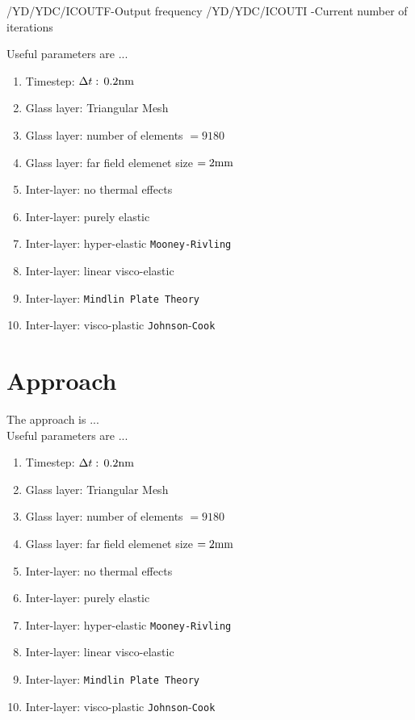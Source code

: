 \documentclass[format=acmtog, 12pt, screen=true, review=false]{acmart}
\begin{document}
/YD/YDC/ICOUTF-Output frequency
/YD/YDC/ICOUTI   -Current number of iterations


Useful parameters are ...
\begin{enumerate}
    \item Timestep: $\Delta t:\,0.2\rm{nm}$ \cite{Che18}
    \item Glass layer: Triangular Mesh \cite{Che18}
    \item Glass layer: number of elements $=9180$ \cite{Che18}
    \item Glass layer: far field elemenet size $=2\rm{mm}$ \cite{Che18}
    \item Inter-layer: no thermal effects \cite{Che18}
    \item Inter-layer: purely elastic \cite{Che18, Ji98}
    \item Inter-layer: hyper-elastic \texttt{Mooney-Rivling} \cite{Che16}
    \item Inter-layer: linear visco-elastic \cite{Flo98}
    \item Inter-layer: \texttt{Mindlin Plate Theory} \cite{Yua17, ElS18}
    \item Inter-layer: visco-plastic \texttt{Johnson}-\texttt{Cook} \cite{Xu11, Gao14}
\end{enumerate}

\section{Approach}

The approach is ... \\

Useful parameters are ...
\begin{enumerate}
    \item Timestep: $\Delta t:\,0.2\rm{nm}$ \cite{Che18}
    \item Glass layer: Triangular Mesh \cite{Che18}
    \item Glass layer: number of elements $=9180$ \cite{Che18}
    \item Glass layer: far field elemenet size $=2\rm{mm}$ \cite{Che18}
    \item Inter-layer: no thermal effects \cite{Che18}
    \item Inter-layer: purely elastic \cite{Che18, Ji98}
    \item Inter-layer: hyper-elastic \texttt{Mooney-Rivling} \cite{Che16}
    \item Inter-layer: linear visco-elastic \cite{Flo98}
    \item Inter-layer: \texttt{Mindlin Plate Theory} \cite{Yua17, ElS18}
    \item Inter-layer: visco-plastic \texttt{Johnson}-\texttt{Cook} \cite{Xu11, Gao14}
\end{enumerate}
\end{document}
